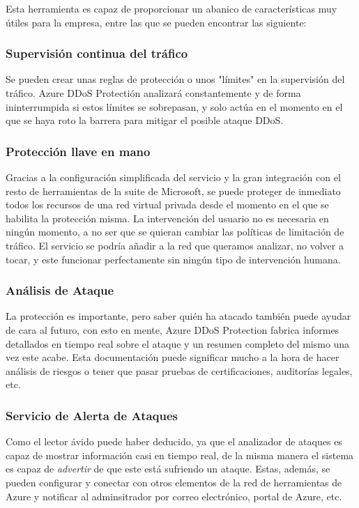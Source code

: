 \documentclass{article}
\begin{document}
Esta herramienta es capaz de proporcionar un abanico de características muy
útiles para la empresa, entre las que se pueden encontrar las siguiente:

\subsubsection*{Supervisión continua del tráfico}
Se pueden crear unas reglas de protección o unos "límites" en la supervisión del
tráfico. Azure DDoS Protectión analizará constantemente y de forma
ininterrumpida si estos límites se sobrepasan, y solo actúa en el momento en el
que se haya roto la barrera para mitigar el posible ataque DDoS.
    
\subsubsection*{Protección llave en mano}
Gracias a la configuración simplificada del servicio y la gran integración con
el resto de herramientas de la suite de Microsoft, se puede proteger de
inmediato todos los recursos de una red virtual privada desde el momento en el
que se habilita la protección misma. La intervención del usuario no es necesaria
en ningún momento, a no ser que se quieran cambiar las políticas de limitación
de tráfico. El servicio se podría añadir a la red que queramos analizar, no
volver a tocar, y este funcionar perfectamente sin ningún tipo de intervención
humana.

\subsubsection*{Análisis de Ataque}
La protección es importante, pero saber quién ha atacado también puede ayudar de
cara al futuro, con esto en mente, Azure DDoS Protection fabrica informes
detallados en tiempo real sobre el ataque y un resumen completo del mismo una
vez este acabe. Esta documentación puede significar mucho a la hora de hacer
análisis de riesgos o tener que pasar pruebas de certificaciones, auditorías
legales, etc.\

\subsubsection*{Servicio de Alerta de Ataques}
Como el lector ávido puede haber deducido, ya que el analizador de ataques es
capaz de mostrar información casi en tiempo real, de la misma manera el sistema
es capaz de \textit{advertir} de que este está sufriendo un ataque. Estas,
además, se pueden configurar y conectar con otros elementos de la red de
herramientas de Azure y notificar al adminsitrador por correo electrónico,
portal de Azure, etc.\
\end{document}
